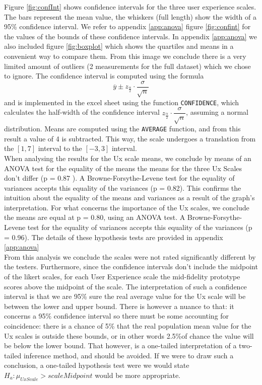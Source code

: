 \documentclass[a4paper, 11pt]{article}
\begin{document}
Figure \ref{fig:confInt} shows confidence intervals for the three user experience scales. The bars represent the mean value, the whiskers (full length) show the width of a 95\% confidence interval. We refer to appendix \ref{app:anova} figure \ref{fig:confint} for the values of the bounds of these confidence intervals. In appendix \ref{app:anova} we also included figure \ref{fig:boxplot} which shows the quartiles and means in a convenient way to compare them. From this image we conclude there is a very limited amount of outliers (2 measurements for the full dataset) which we chose to ignore. The confidence interval is computed using the formula 
\[
	\overline{y} \pm z_{\frac{\alpha}{2}}\cdot \dfrac{\sigma}{\sqrt{n}}
\]
and is implemented in the excel sheet using the function \texttt{CONFIDENCE}, which calculates the half-width of the confidence interval $z_{\frac{\alpha}{2}}\cdot \dfrac{\sigma}{\sqrt{n}}$, assuming a normal distribution.  Means are computed using the \texttt{AVERAGE} function, and from this result a value of 4 is subtracted. This way, the scale undergoes a translation from the $[1,7]$ interval to the $[-3,3]$ interval.\\

When analysing the results for the Ux scale means, we conclude by means of an ANOVA test for the equality of the means the means for the three Ux Scales don't differ (p = 0.87 ). A Browne-Forsythe-Levene test for the equality of variances accepts this equality of the variances (p = 0.82). This confirms the intuition about the equality of the means and variances as a result of the graph's interpretation. For what concerns the importance of the Ux scales, we conclude the means are equal at p = 0.80, using an ANOVA test. A Browne-Forsythe-Levene test for the equality of variances accepts this equality of the variances (p = 0.96). The details of these hypothesis tests are provided in appendix \ref{app:anova}\\

From this analysis we conclude the scales were not rated significantly different by the testers. Furthermore, since the confidence intervals don't include the midpoint of the likert scales, for each User Experience scale the mid-fidelity prototype scores above the midpoint of the scale. The interpretation of such a confidence interval is that we are 95\% sure the real average value for the Ux scale will be between the lower and upper bound. There is however a nuance to that: it concerns a 95\% confidence interval so there must be some accounting for coincidence: there is a chance of 5\% that the real population mean value for the Ux scales is outside these bounds, or in other words 2.5\%of chance the value will be below the lower bound. That however, is a one-tailed interpretation of a two-tailed inference method, and should be avoided. If we were to draw such a conclusion, a one-tailed hypothesis test were we would state $H_a:\mu_{UxScale} > scaleMidpoint$ would be more appropriate.
\end{document}
